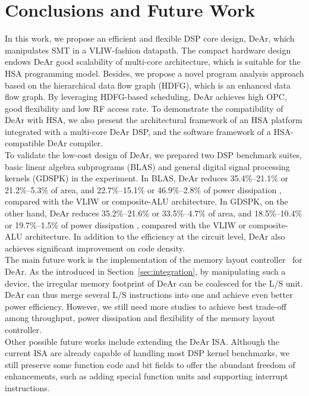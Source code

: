 \chapter{Conclusions and Future Work}
In this work, we propose an efficient and flexible DSP core design, DeAr,
which manipulates SMT in a VLIW-fashion datapath.
The compact hardware design endows DeAr good scalability of multi-core architecture, 
which is suitable for the HSA programming model.
Besides, we propose a novel program analysis approach based on the hierarchical data flow graph (HDFG), which is an enhanced data flow graph.
By leveraging HDFG-based scheduling, DeAr achieves high OPC, good flexibility and low RF access rate.
To demonstrate the compatibility of DeAr with HSA,
we also present the architectural framework of an HSA platform integrated with a multi-core DeAr DSP, 
and the software framework of a HSA-compatible DeAr compiler.
\\\indent
To validate the low-cost design of DeAr, we prepared two DSP benchmark suites, basic linear algebra subprograms (BLAS) and general digital signal processing kernels (GDSPK) in the experiment.
In BLAS, DeAr reduces 35.4\%--21.1\% or 21.2\%--5.3\% of area,
and 22.7\%--15.1\% or 46.9\%--2.8\% of power dissipation , compared with the VLIW or composite-ALU architecture.
In GDSPK, on the other hand, DeAr reduces 35.2\%--21.6\% or 33.5\%--4.7\% of area, 
and 18.5\%--10.4\% or 19.7\%--1.5\% of power dissipation , compared with the VLIW or composite-ALU architecture.
In addition to the efficiency at the circuit level, DeAr also achieves significant improvement on code density.
\\\indent
The main future work is the implementation of the memory layout controller~\cite{sc} for DeAr.
As the introduced in Section~\ref{sec:integration}, by manipulating such a device, the irregular memory footprint of DeAr can be coalesced for the L/S unit.
DeAr can thus merge several L/S instructions into one and achieve even better power efficiency.
However, we still need more studies to achieve best trade-off among throughput, power dissipation and flexibility of the memory layout controller.
\\\indent
Other possible future works include extending the DeAr ISA.
Although the current ISA are already capable of handling most DSP kernel benchmarks, 
we still preserve some function code and bit fields to offer the abundant freedom of enhancements, 
such as adding special function units and supporting interrupt instructions.
